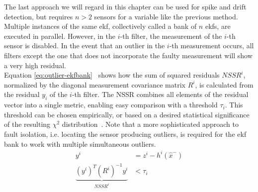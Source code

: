 The last approach we will regard in this chapter can be used for spike and drift detection, but requires $n>2$ sensors for a variable like the previous method. Multiple instances of the same \gls{ekf}, collectively called a bank of $n$ \gls{ekf}s, are executed in parallel. However, in the $i$-th filter, the measurement of the $i$-th sensor is disabled. In the event that an outlier in the $i$-th measurement occurs, all filters except the one that does not incorporate the faulty measurement will show a very high residual. \\ Equation \ref{eq:outlier-ekfbank}~\cite[p.~3]{Kobayashi.2003} shows how the sum of squared residuals $\textit{NSSR}^i$, normalized by the diagonal measurement covariance matrix $R^i$, is calculated from the residual $y_i$ of the $i$-th filter. The NSSR combines all elements of the residual vector into a single metric, enabling easy comparison with a threshold $\tau_i$. This threshold can be chosen empirically, or based on a desired statistical significance of the resulting $\chi^2$ distribution~\cite[p.~3]{Xue.2007}. Note that a more sophisticated approach to fault isolation, i.e. locating the sensor producing outliers, is required for the \gls{ekf} bank to work with multiple simultaneous outliers.
\begin{subequations}\label{eq:outlier-ekfbank}
\begin{alignat}{2}%
y^i &= z^i - h^i(\hat{x}^-) \\%
\underbrace{(y^i)^T (R^i)^{-1} y^i}_\textrm{$\textit{NSSR}^i$} &< \tau_i%
\end{alignat}
\end{subequations}
